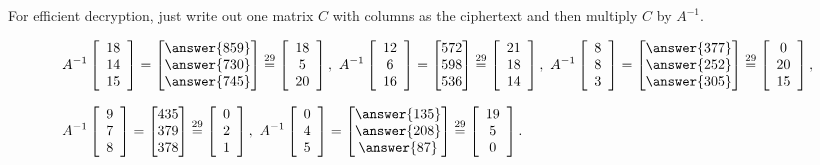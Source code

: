 \documentclass{ximera}
\begin{document}
\begin{example}
  \begin{hint}
    For efficient decryption, just write out one matrix $C$ with columns as the ciphertext and then multiply $C$ by $A^{-1}$. 
  \end{hint}

  \begin{align*}
    &A^{-1} \startmat{c} 18 \\ 14 \\ 15 \stopmat
    = \begin{bmatrix}
      \answer{859} \\
      \answer{730} \\
      \answer{745}
      \end{bmatrix}\stackrel{29}{=}\startmat{c} 18 \\ 5 \\ 20 \stopmat,
    \quad
    A^{-1} \startmat{c} 12 \\ 6 \\ 16 \stopmat
    = \begin{bmatrix}
      572 \\
      598 \\
      536
      \end{bmatrix}\stackrel{29}{=}\startmat{c} 21 \\ 18 \\ 14 \stopmat,
    \quad
    A^{-1} \startmat{c} 8 \\ 8 \\ 3 \stopmat
    = \begin{bmatrix}
      \answer{377} \\
      \answer{252} \\
      \answer{305}
      \end{bmatrix}\stackrel{29}{=}\startmat{c} 0 \\ 20 \\ 15 \stopmat,
    \\\\[-2ex]
    &A^{-1} \startmat{c} 9 \\ 7 \\ 8 \stopmat
    = \begin{bmatrix}
      435 \\
      379 \\
      378
      \end{bmatrix}\stackrel{29}{=}\startmat{c} 0 \\ 2 \\ 1 \stopmat,
    \quad
    A^{-1} \startmat{c} 0 \\ 4 \\ 5 \stopmat
    = \begin{bmatrix}
      \answer{135} \\
      \answer{208} \\
      \answer{87}
      \end{bmatrix}\stackrel{29}{=}\startmat{c} 19 \\ 5 \\ 0 \stopmat.
  \end{align*}


\end{example}
\end{document}
